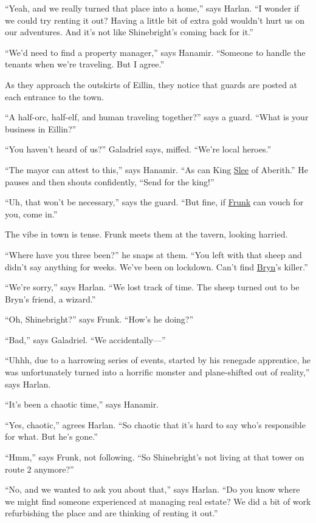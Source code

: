 \documentclass[smalldemyvopaper,11pt,twoside,onecolumn,openright,extrafontsizes]{memoir}
\begin{document}
``Yeah, and we really turned that place into a home,'' says Harlan. ``I
wonder if we could try renting it out? Having a little bit of extra gold
wouldn't hurt us on our adventures. And it's not like Shinebright's
coming back for it.''

``We'd need to find a property manager,'' says Hanamir. ``Someone to
handle the tenants when we're traveling. But I agree.''

As they approach the outskirts of Eillin, they notice that guards are
posted at each entrance to the town.

``A half-orc, half-elf, and human traveling together?'' says a guard.
``What is your business in Eillin?''

``You haven't heard of us?'' Galadriel says, miffed. ``We're local
heroes.''

``The mayor can attest to this,'' says Hanamir. ``As can King
\href{/characters/slee/}{Slee} of Aberith.'' He pauses and then shouts
confidently, ``Send for the king!''

``Uh, that won't be necessary,'' says the guard. ``But fine, if
\href{/characters/frunk/}{Frunk} can vouch for you, come in.''

The vibe in town is tense. Frunk meets them at the tavern, looking
harried.

``Where have you three been?'' he snaps at them. ``You left with that
sheep and didn't say anything for weeks. We've been on lockdown. Can't
find \href{/characters/bryn/}{Bryn}'s killer.''

``We're sorry,'' says Harlan. ``We lost track of time. The sheep turned
out to be Bryn's friend, a wizard.''

``Oh, Shinebright?'' says Frunk. ``How's he doing?''

``Bad,'' says Galadriel. ``We accidentally---''

``Uhhh, due to a harrowing series of events, started by his renegade
apprentice, he was unfortunately turned into a horrific monster and
plane-shifted out of reality,'' says Harlan.

``It's been a chaotic time,'' says Hanamir.

``Yes, chaotic,'' agrees Harlan. ``So chaotic that it's hard to say
who's responsible for what. But he's gone.''

``Hmm,'' says Frunk, not following. ``So Shinebright's not living at
that tower on route 2 anymore?''

``No, and we wanted to ask you about that,'' says Harlan. ``Do you know
where we might find someone experienced at managing real estate? We did
a bit of work refurbishing the place and are thinking of renting it
out.''
\end{document}

